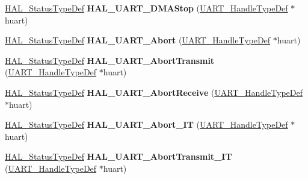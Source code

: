 \begin{DoxyCompactItemize}
\mbox{\hyperlink{stm32f4xx__hal__def_8h_a63c0679d1cb8b8c684fbb0632743478f}{H\+A\+L\+\_\+\+Status\+Type\+Def}} {\bfseries H\+A\+L\+\_\+\+U\+A\+R\+T\+\_\+\+D\+M\+A\+Stop} (\mbox{\hyperlink{struct_u_a_r_t___handle_type_def}{U\+A\+R\+T\+\_\+\+Handle\+Type\+Def}} $\ast$huart)
\item 
\mbox{\label{group___u_a_r_t___exported___functions___group2_ga2d7be1f59fc810f49dadc580307a4862}} 
\mbox{\hyperlink{stm32f4xx__hal__def_8h_a63c0679d1cb8b8c684fbb0632743478f}{H\+A\+L\+\_\+\+Status\+Type\+Def}} {\bfseries H\+A\+L\+\_\+\+U\+A\+R\+T\+\_\+\+Abort} (\mbox{\hyperlink{struct_u_a_r_t___handle_type_def}{U\+A\+R\+T\+\_\+\+Handle\+Type\+Def}} $\ast$huart)
\item 
\mbox{\label{group___u_a_r_t___exported___functions___group2_ga5a8858ffca45541416097961523d5fb2}} 
\mbox{\hyperlink{stm32f4xx__hal__def_8h_a63c0679d1cb8b8c684fbb0632743478f}{H\+A\+L\+\_\+\+Status\+Type\+Def}} {\bfseries H\+A\+L\+\_\+\+U\+A\+R\+T\+\_\+\+Abort\+Transmit} (\mbox{\hyperlink{struct_u_a_r_t___handle_type_def}{U\+A\+R\+T\+\_\+\+Handle\+Type\+Def}} $\ast$huart)
\item 
\mbox{\label{group___u_a_r_t___exported___functions___group2_ga9732372cfae60c019bb41554ab12edd6}} 
\mbox{\hyperlink{stm32f4xx__hal__def_8h_a63c0679d1cb8b8c684fbb0632743478f}{H\+A\+L\+\_\+\+Status\+Type\+Def}} {\bfseries H\+A\+L\+\_\+\+U\+A\+R\+T\+\_\+\+Abort\+Receive} (\mbox{\hyperlink{struct_u_a_r_t___handle_type_def}{U\+A\+R\+T\+\_\+\+Handle\+Type\+Def}} $\ast$huart)
\item 
\mbox{\label{group___u_a_r_t___exported___functions___group2_ga3183626ee21f103cbcb50241eca50e4d}} 
\mbox{\hyperlink{stm32f4xx__hal__def_8h_a63c0679d1cb8b8c684fbb0632743478f}{H\+A\+L\+\_\+\+Status\+Type\+Def}} {\bfseries H\+A\+L\+\_\+\+U\+A\+R\+T\+\_\+\+Abort\+\_\+\+IT} (\mbox{\hyperlink{struct_u_a_r_t___handle_type_def}{U\+A\+R\+T\+\_\+\+Handle\+Type\+Def}} $\ast$huart)
\item 
\mbox{\label{group___u_a_r_t___exported___functions___group2_ga0fba12f56413e2dbe8b96040ecf5aa7e}} 
\mbox{\hyperlink{stm32f4xx__hal__def_8h_a63c0679d1cb8b8c684fbb0632743478f}{H\+A\+L\+\_\+\+Status\+Type\+Def}} {\bfseries H\+A\+L\+\_\+\+U\+A\+R\+T\+\_\+\+Abort\+Transmit\+\_\+\+IT} (\mbox{\hyperlink{struct_u_a_r_t___handle_type_def}{U\+A\+R\+T\+\_\+\+Handle\+Type\+Def}} $\ast$huart)

\end{DoxyCompactItemize}
